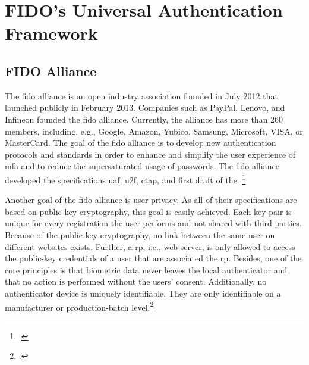 \section{FIDO's Universal Authentication Framework}
\subsection{FIDO Alliance}
\label{subsec:fido_alliance}

The \gls{fido} alliance is an open industry association founded in July 2012 that launched publicly in February 2013. Companies such as PayPal, Lenovo, and Infineon founded the \gls{fido} alliance. Currently, the alliance has more than 260 members, including, e.g., Google, Amazon, Yubico, Samsung, Microsoft, VISA, or MasterCard. The goal of the \gls{fido} alliance is to develop new authentication protocols and standards in order to enhance and simplify the user experience of \gls{mfa} and to reduce the supersaturated usage of passwords. The \gls{fido} alliance developed the specifications \gls{uaf}, \gls{u2f}, \gls{ctap}, and first draft of the \wa.\footcites[See][]{fido-history}[See][583]{eckert-it-sec-9}[See][17]{fido-ct-2}

Another goal of the \gls{fido} alliance is user privacy. As all of their specifications are based on public-key cryptography, this goal is easily achieved. Each key-pair is unique for every registration the user performs and not shared with third parties. Because of the public-key cryptography, no link between the same user on different websites exists. Further, a \gls{rp}, i.e., web server, is only allowed to access the public-key credentials of a user that are associated the \gls{rp}. Besides, one of the core principles is that biometric data never leaves the local authenticator and that no action is performed without the users' consent. Additionally, no authenticator device is uniquely identifiable. They are only identifiable on a manufacturer or production-batch level.\footcite[See][6--7]{fido-privacy}


